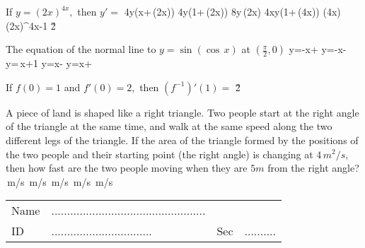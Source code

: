 \documentclass[amsfonts,bezier,leqno,fleqn,12pt,a4paper]{article}
\begin{document}
{\begin{large}
\newpage



\item %
If $y=(2x)^{4x},$ then $y'=$
\sc
\be
4y(x+\ln\,(2x))
\ee
\be
4y(1+\ln\,(2x))
\ee
\be
8y\,\ln(2x)
\ee
\be
4xy(1+\ln\,(4x))
\ee
\be
(4x)\cdot(2x)^{4x-1}
\ee
\v2



\item %
The equation of the normal line to $y=\sin(\cos\,x)$ at $\displaystyle \left(\frac{\pi}{2},0\right)$
\sc
\be
y=-x\displaystyle +
\ee
\be
y=-x\displaystyle -
\ee
\be
y=\displaystyle {}\,x+1
\ee
\be
y=x-\displaystyle {}
\ee
\be
y=x+\displaystyle {}
\ee

\newpage



\item %
If $f(0)=1$ and $f'(0)=2,$ then $(f^{-1})'(1)=$
\sc
\be
\displaystyle {}
\ee
\be
\displaystyle {}
\ee
\be
\displaystyle {}
\ee
\be
\displaystyle {}
\ee
{}
\ee
\v2



\item %
A piece of land is shaped like a right triangle. Two people start at the right angle of the triangle at the same time, and walk at the same speed along the two different legs of the triangle. If the area of the triangle formed by the positions of the two people and their starting point (the right angle) is changing at $4\,m^2/s,$ then how fast are the two people moving when they are $5m$ from the right angle?
\sc
{}\,m/s
\ee
{}\,m/s
\ee
{}\,m/s
\ee
{}\,m/s
\ee
{}\,m/s
\ee

\newpage



\en
\end{large}

\newpage


\renewcommand{\thepage}{\noindent Math 101, Term 171, Exam II \hfill Answer Sheet  \hfill {\bf \fbox{001}}}

\begin{Large}


\begin{tabular}{llll}
Name & .................................................& & \\
ID &   ................................& Sec & ..........\\
\end{tabular}


\end{Large}}
\end{document}
